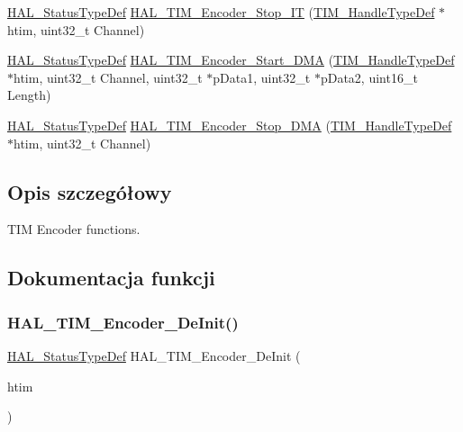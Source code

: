 \begin{DoxyCompactItemize}
\item 
\hyperlink{stm32f4xx__hal__def_8h_a63c0679d1cb8b8c684fbb0632743478f}{H\+A\+L\+\_\+\+Status\+Type\+Def} \hyperlink{group___t_i_m___exported___functions___group6_gac07923b4764255a1e0b82c975689542d}{H\+A\+L\+\_\+\+T\+I\+M\+\_\+\+Encoder\+\_\+\+Stop\+\_\+\+IT} (\hyperlink{struct_t_i_m___handle_type_def}{T\+I\+M\+\_\+\+Handle\+Type\+Def} $\ast$htim, uint32\+\_\+t Channel)
\item 
\hyperlink{stm32f4xx__hal__def_8h_a63c0679d1cb8b8c684fbb0632743478f}{H\+A\+L\+\_\+\+Status\+Type\+Def} \hyperlink{group___t_i_m___exported___functions___group6_ga8b9798534ad0917d31d581afe720d8cf}{H\+A\+L\+\_\+\+T\+I\+M\+\_\+\+Encoder\+\_\+\+Start\+\_\+\+D\+MA} (\hyperlink{struct_t_i_m___handle_type_def}{T\+I\+M\+\_\+\+Handle\+Type\+Def} $\ast$htim, uint32\+\_\+t Channel, uint32\+\_\+t $\ast$p\+Data1, uint32\+\_\+t $\ast$p\+Data2, uint16\+\_\+t Length)
\item 
\hyperlink{stm32f4xx__hal__def_8h_a63c0679d1cb8b8c684fbb0632743478f}{H\+A\+L\+\_\+\+Status\+Type\+Def} \hyperlink{group___t_i_m___exported___functions___group6_ga12ea48505e269532feff5b64f605b56f}{H\+A\+L\+\_\+\+T\+I\+M\+\_\+\+Encoder\+\_\+\+Stop\+\_\+\+D\+MA} (\hyperlink{struct_t_i_m___handle_type_def}{T\+I\+M\+\_\+\+Handle\+Type\+Def} $\ast$htim, uint32\+\_\+t Channel)
\end{DoxyCompactItemize}


\subsection{Opis szczegółowy}
T\+IM Encoder functions. 



\subsection{Dokumentacja funkcji}
\mbox{\label{group___t_i_m___exported___functions___group6_gaaf99281fd7635e20c08e48bfc9ea11e3}} 
\subsubsection{\texorpdfstring{H\+A\+L\+\_\+\+T\+I\+M\+\_\+\+Encoder\+\_\+\+De\+Init()}{HAL\_TIM\_Encoder\_DeInit()}}
{\footnotesize\ttfamily \hyperlink{stm32f4xx__hal__def_8h_a63c0679d1cb8b8c684fbb0632743478f}{H\+A\+L\+\_\+\+Status\+Type\+Def} H\+A\+L\+\_\+\+T\+I\+M\+\_\+\+Encoder\+\_\+\+De\+Init (\begin{DoxyParamCaption}\item[{\hyperlink{struct_t_i_m___handle_type_def}{T\+I\+M\+\_\+\+Handle\+Type\+Def} $\ast$}]{htim }\end{DoxyParamCaption})}

